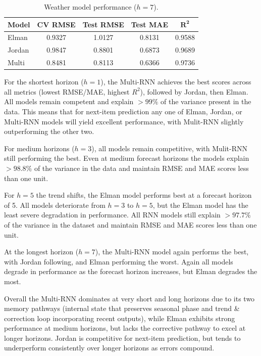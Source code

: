 \documentclass[conference]{IEEEtran}
\begin{document}
\begin{table}[H]
\centering
\caption{Weather model performance ($h=7$).}
\label{tab:wx_h7}
\begin{tabular}{lcccc}
\toprule
\textbf{Model} & \textbf{CV RMSE} & \textbf{Test RMSE} & \textbf{Test MAE} & $\mathbf{R^2}$ \\
\midrule
Elman  & 0.9327 & 1.0127 & 0.8131 & 0.9588 \\
Jordan & 0.9847 & 0.8801 & 0.6873 & 0.9689 \\
Multi  & 0.8481 & 0.8113 & 0.6366 & 0.9736 \\
\bottomrule
\end{tabular}
\end{table}

For the shortest horizon ($h=1$), the Multi-RNN achieves the best scores across all metrics (lowest RMSE/MAE, highest $R^2$), followed by Jordan, then Elman. All models remain competent and explain $> 99\%$ of the variance present in the data. This means that for next-item prediction any one of Elman, Jordan, or Multi-RNN models will yield excellent performance, with Mulit-RNN slightly outperforming the other two.

For medium horizons ($h=3$), all models remain competitive, with Mulit-RNN still performing the best. Even at medium forecast horizons the models explain $>98.8\%$ of the variance in the data and maintain RMSE and MAE scores less than one unit.

For $h=5$ the trend shifts, the Elman model performs best at a forecast horizon of 5. All models deteriorate from $h=3$ to $h=5$, but the Elman model has the least severe degradation in performance. All RNN models still explain $> 97.7\%$ of the variance in the dataset and maintain RMSE and MAE scores less than one unit.

At the longest horizon ($h=7$), the Multi-RNN model again performs the best, with Jordan following, and Elman performing the worst. Again all models degrade in performance as the forecast horizon increases, but Elman degrades the most.

Overall the Multi-RNN dominates at very short and long horizons due to its two memory pathways (internal state that preserves seasonal phase and trend \& correction loop incorporating recent outputs), while Elman exhibits strong performance at medium horizons, but lacks the corrective pathway to excel at longer horizons. Jordan is competitive for next-item prediction, but tends to underperform consistently over longer horizons as errors compound.
\end{document}
